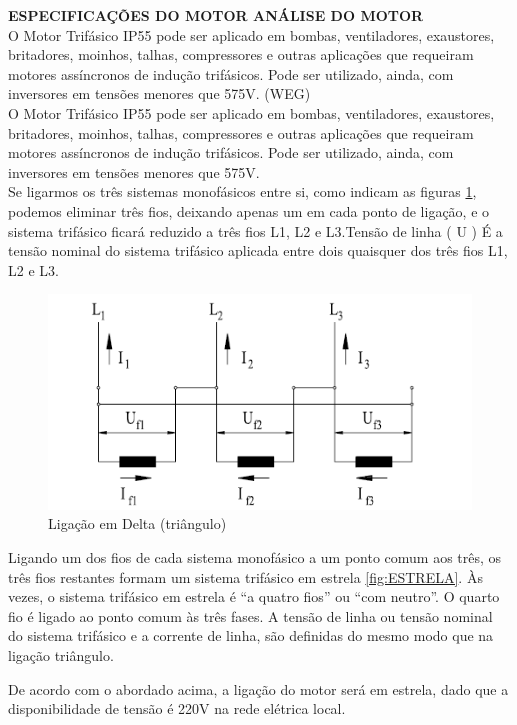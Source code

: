 \textbf{ESPECIFICAÇÕES DO MOTOR ANÁLISE DO MOTOR}\\
O Motor Trifásico IP55 pode ser aplicado em bombas, ventiladores, exaustores, britadores, moinhos, talhas, compressores e outras aplicações que requeiram motores assíncronos de indução trifásicos. Pode ser utilizado, ainda, com inversores em tensões menores que 575V. (WEG)\\

O Motor Trifásico IP55 pode ser aplicado em bombas, ventiladores, exaustores, britadores, moinhos, talhas, compressores e outras aplicações que requeiram motores assíncronos de indução trifásicos. Pode ser utilizado, ainda, com inversores em tensões menores que 575V.\\

Se ligarmos os três sistemas monofásicos entre si, como indicam as figuras \ref{fig:TRIANGULO}, podemos eliminar três fios, deixando apenas um em cada ponto de ligação, e o sistema trifásico ficará reduzido a três fios L1, L2 e L3.Tensão de linha ( U ) É a tensão nominal do sistema trifásico aplicada entre dois quaisquer dos
três fios L1, L2 e L3.

\begin{figure}[!ht]
\centering
\includegraphics[scale=0.8]{figuras/TRIANGULO.png}
\caption{Ligação em Delta (triângulo)}
\label{fig:TRIANGULO}
\end{figure}

Ligando um dos fios de cada sistema monofásico a um ponto comum aos três, os três fios restantes formam um sistema trifásico em estrela \ref{fig:ESTRELA}. Às vezes, o sistema trifásico em estrela é “a quatro fios” ou “com neutro”. O quarto fio é ligado ao ponto comum às três fases. A tensão de linha ou tensão nominal do sistema trifásico e a corrente de linha, são definidas do mesmo modo que na ligação triângulo.

De acordo com o abordado acima, a ligação do motor será em estrela, dado que a disponibilidade de tensão é 220V na rede elétrica local.

